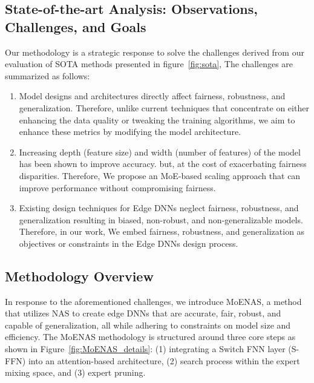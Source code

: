 \subsection{State-of-the-art Analysis: Observations, Challenges, and Goals}

Our methodology is a strategic response to solve the challenges derived from our evaluation of SOTA methods presented in figure~\ref{fig:sota}, The challenges are summarized as follows:
%
\begin{enumerate}[leftmargin=*]
    \item Model designs and architectures directly affect fairness, robustness, and generalization. Therefore, unlike current techniques that concentrate on either enhancing the data quality or tweaking the training algorithms, we aim to enhance these metrics by modifying the model architecture.
    \item Increasing depth (feature size) and width (number of features) of the model has been shown to improve accuracy. but, at the cost of exacerbating fairness disparities. Therefore, We propose an MoE-based scaling approach that can improve performance without compromising fairness.
    \item Existing design techniques for Edge DNNs neglect fairness, robustness, and generalization resulting in biased, non-robust, and non-generalizable models. Therefore, in our work, We embed fairness, robustness, and generalization as objectives or constraints in the Edge DNNs design process.
\end{enumerate}
%
\subsection{Methodology Overview}

In response to the aforementioned challenges, we introduce MoENAS, a method that utilizes NAS to create edge DNNs that are accurate, fair, robust, and capable of generalization, all while adhering to constraints on model size and efficiency. The MoENAS methodology is structured around three core steps as shown in Figure~\ref{fig:MoENAS_details}: (1) integrating a Switch FNN layer (S-FFN) into an attention-based architecture, (2) search process within the expert mixing space, and (3) expert pruning. 





